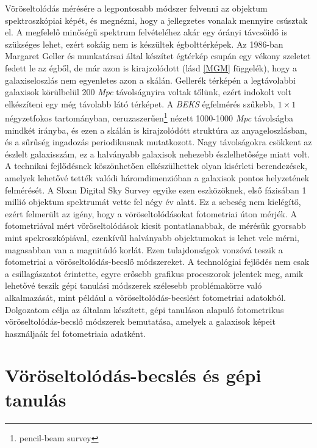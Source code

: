 \documentclass[12pt,letterpaper,oneside,openright]{book}
\begin{document}
Vöröseltolódás mérésére a legpontosabb módszer felvenni az objektum spektroszkópiai képét, és megnézni, hogy a jellegzetes vonalak mennyire csúsztak el. A megfelelő minőségű spektrum felvételéhez akár egy órányi távcsőidő is szükséges lehet, ezért sokáig nem is készültek égbolttérképek. Az 1986-ban Margaret Geller és munkatársai által készítet égtérkép\cite{mg} csupán egy vékony szeletet fedett le az égből, de már azon is kirajzolódott (lásd \ref{MGM} függelék), hogy a galaxiseloszlás nem egyenletes azon a skálán. Gellerék térképén a legtávolabbi galaxisok körülbelül 200 \textit{Mpc} távolságnyira voltak tőlünk, ezért indokolt volt elkészíteni egy még távolabb látó térképet. A \textit{BEKS}\cite{beks} égfelmérés szűkebb, $1\times 1$ négyzetfokos tartományban, ceruzaszerűen\footnote{pencil-beam survey} nézett 1000-1000 \textit{Mpc} távolságba mindkét irányba, és ezen a skálán is kirajzolódótt struktúra az anyageloszlásban, és a sűrűség ingadozás periodikusnak mutatkozott. Nagy távolságokra csökkent az észlelt galaxisszám, ez a halványabb galaxisok nehezebb észlelhetősége miatt volt. A technikai fejlődésnek köszönhetően elkészülhettek olyan kisérleti berendezések, amelyek lehetővé tették valódi háromdimenzióban a galaxisok pontos helyzetének felmérését. A Sloan Digital Sky Survey egyike ezen eszközöknek, első fázisában 1 millió objektum spektrumát vette fel négy év alatt\cite{fr}. Ez a sebeség nem kielégítő, ezért felmerült az igény, hogy a vöröseltolódásokat fotometriai úton mérjék. A fotometriával mért vöröseltolódások kicsit pontatlanabbak, de mérésük gyorsabb mint spekroszkópiával, ezenkívűl halványabb objektumokat is lehet vele mérni, magasabban van a magnitúdó korlát. Ezen tulajdonságok vonzóvá teszik a fotometriai a vöröseltolódás-becslő módszereket. A technológiai fejlődés nem csak a csillagászatot érintette, egyre erősebb grafikus proceszorok jelentek meg, amik lehetővé teszik gépi tanulási módszerek szélesebb problémakörre való alkalmazását, mint például a vöröseltolódás-becslést fotometriai adatokból.
\newline \indent
Dolgozatom célja az általam készített, gépi tanuláson alapuló fotometrikus vöröseltolódás-becslő módszerek bemutatása, amelyek a galaxisok képeit használjaák fel fotometriaia adatként. 


\chapter{Vöröseltolódás-becslés és gépi tanulás} %
\end{document}
